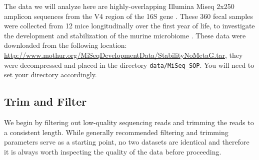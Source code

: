The data we will analyze here are highly-overlapping Illumina Miseq
2x250 amplicon sequences from the V4 region of the 16S gene \cite{Kozich2013}.
These 360 fecal samples were collected from 12 mice longitudinally over the
first year of life, to investigate the development and 
stabilization of the murine microbiome \cite{schloss2012stabilization}.
These data were downloaded from the following location:
\url{http://www.mothur.org/MiSeqDevelopmentData/StabilityNoMetaG.tar}, they were
decompressed 
and placed in the directory {\tt data/MiSeq\_SOP}. 
You will need to set your directory accordingly.
\begin{knitrout}
\color{fgcolor}\begin{kframe}
\begin{alltt}
 \hlkwb{<-} \hlstd{(}\hlstd{,} \hlstd{)}
 \hlkwb{<-} \hlstd{(}\hlstd{,} \hlstd{)}

\hlstd{(}\hlopt{!}\hlstd{(}
  \hlstd{(}\hlstd{,}
                \hlstd{=}  \hlstd{))}
  \hlstd{(}\hlstd{(}\hlstd{,}  \hlstd{),}
                \hlstd{))}
\hlstd{\}}

 \hlkwb{<-} \hlstd{(}  \hlstd{=} \hlstd{))}
 \hlkwb{<-} \hlstd{fns[}\hlstd{(}\hlstd{, fns)]}
 \hlkwb{<-} \hlstd{fns[}\hlstd{(}\hlstd{, fns)]}
\end{alltt}
\end{kframe}
\end{knitrout}

\subsection*{Trim and Filter}

We begin by filtering out low-quality sequencing reads and trimming the
reads to a consistent length. While generally recommended filtering and
trimming parameters serve as a starting point, no two datasets are
identical and therefore it is always worth inspecting the quality of the
data before proceeding.


